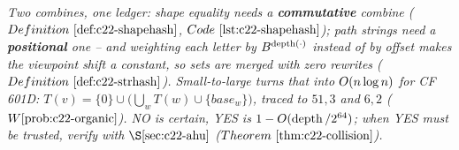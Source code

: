 \begin{recallbox}
\emph{Two combines, one ledger: shape equality needs a \textbf{commutative}
combine (\(\defref{c22-shapehash}\), \(\coderef{c22-shapehash}\)); path strings need
a \textbf{positional} one -- and weighting each letter by \(B^{\operatorname{depth}(\cdot)}\)
instead of by offset makes the viewpoint shift a constant, so sets are merged with
zero rewrites (\(\defref{c22-strhash}\)).  Small-to-large turns that into
\(O(n\log n)\) for CF 601D: \(T(v)=\{0\}\cup\bigl(\bigcup_w T(w)\cup\{\mathit{base}_w\}\bigr)\),
traced to \(51,3\) and \(6,2\) (\(\probref{c22-organic}\)).  NO is certain, YES is
\(1-O(\operatorname{depth}/2^{64})\); when YES must be trusted, verify with
\(\secref{c22-ahu}\) (\(\thmref{c22-collision}\)).}
\end{recallbox}
